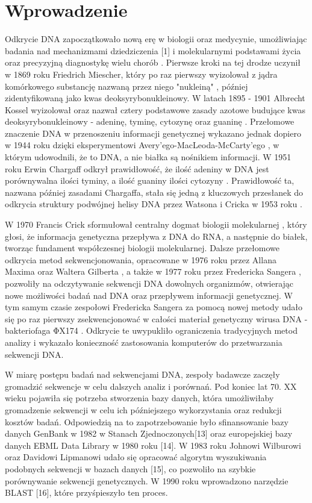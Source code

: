 \clearpage
\section{Wprowadzenie}

Odkrycie DNA zapoczątkowało nową erę w biologii oraz medycynie, umożliwiając badania
nad mechanizmami dziedziczenia [1] i molekularnymi podstawami życia oraz precyzyjną 
diagnostykę wielu chorób \cite{Louie:2000}. Pierwsze kroki na tej drodze uczynił w 1869 roku 
Friedrich Miescher, który po raz pierwszy wyizolował z jądra komórkowego substancję 
nazwaną przez niego "nukleiną" \cite{Dahm:2005}, później zidentyfikowaną jako kwas deoksyrybonukleinowy. 
W latach 1895 - 1901 Albrecht Kossel wyizolował oraz nazwał cztery podstawowe zasady 
azotowe budujące kwas deoksyrybonukleinowy - adeninę, tyminę, cytozynę oraz guaninę \cite{Kossel:1893}.
Przełomowe znaczenie DNA w przenoszeniu informacji genetycznej wykazano jednak dopiero 
w 1944 roku dzięki eksperymentowi Avery'ego-MacLeoda-McCarty'ego \cite{Avery:1944}, w którym udowodnili, 
że to DNA, a nie białka są nośnikiem informacji. 
W 1951 roku Erwin Chargaff odkrył prawidłowość, że ilość adeniny w DNA jest porównywalna
ilości tyminy, a ilość guaniny ilości cytozyny \cite{Chargaff:1952}. Prawidłowość ta, nazwana później zasadami
Chargaffa, stała się jedną z kluczowych przesłanek do odkrycia struktury podwójnej helisy 
DNA przez Watsona i Cricka w 1953 roku \cite{Watson:1953}.

W 1970 Francis Crick sformułował centralny dogmat biologii molekularnej \cite{Crick:1970}, który głosi,
że informacja genetyczna przepływa z DNA do RNA, a następnie do białek, tworząc 
fundament współczesnej biologii molekularnej. Dalsze przełomowe odkrycia metod sekwencjonowania,
opracowane w 1976 roku przez Allana Maxima oraz Waltera Gilberta \cite{Maxam:1977}, a także w 1977 roku 
przez Fredericka Sangera \cite{Sanger:1977}, pozwoliły na odczytywanie sekwencji DNA dowolnych organizmów, 
otwierając nowe możliwości badań nad DNA oraz przepływem informacji genetycznej. 
W tym samym czasie zespołowi Fredericka Sangera za pomocą nowej metody udało się 
po raz pierwszy zsekwencjonować w całości materiał genetyczny wirusa DNA - 
bakteriofaga ΦX174 \cite{Sanger:1977_2}. Odkrycie te uwypukliło ograniczenia tradycyjnych metod 
analizy i wykazało konieczność zastosowania komputerów do przetwarzania sekwencji DNA. \cite{Staden:1979}

W miarę postępu badań nad sekwencjami DNA, zespoły badawcze zaczęły gromadzić sekwencje 
w celu dalszych analiz i porównań. Pod koniec lat 70. XX wieku pojawiła się potrzeba 
stworzenia bazy danych, która umożliwiłaby gromadzenie sekwencji w celu ich późniejszego 
wykorzystania oraz redukcji kosztów badań. Odpowiedzią na to zapotrzebowanie było 
sfinansowanie bazy danych GenBank w 1982 w Stanach Zjednoczonych[13] oraz 
europejskiej bazy danych EBML Data Library w 1980 roku [14]. W 1983 roku 
Johnowi Wilburowi oraz Davidowi Lipmanowi udało się opracować algorytm wyszukiwania
podobnych sekwencji w bazach danych [15], co pozwoliło na szybkie porównywanie sekwencji 
genetycznych. W 1990 roku wprowadzono narzędzie BLAST [16], które przyśpieszyło ten 
proces.


